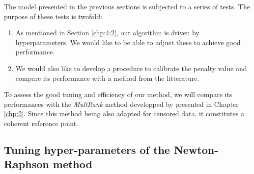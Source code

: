 The model presented in the previous sections is subjected to a series of tests. The purpose of these tests is twofold: 

\begin{enumerate}
    \item As mentioned in Section \ref{chp:4:2}, our algorithm is driven by hyperparameters. We would like to be able to adjust these to achieve good performance.
    \item We would also like to develop a procedure to calibrate the penalty value and compare its performance with a method from the litterature. 
\end{enumerate}

To assess the good tuning and efficiency of our method, we will compare its performances with the \textit{MultRank} method developped by \cite{YutFong2011} presented in Chapter \ref{chp:2}. Since this method being also adapted for censored data, it constitutes a coherent reference point.  

\subsection{Tuning hyper-parameters of the Newton-Raphson method}

